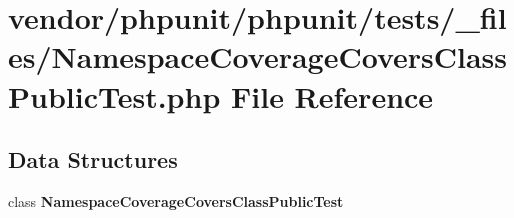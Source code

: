 \section{vendor/phpunit/phpunit/tests/\+\_\+files/\+Namespace\+Coverage\+Covers\+Class\+Public\+Test.php File Reference}
\label{phpunit_2tests_2__files_2_namespace_coverage_covers_class_public_test_8php}
\subsection*{Data Structures}
\begin{DoxyCompactItemize}
\item 
class {\bf Namespace\+Coverage\+Covers\+Class\+Public\+Test}
\end{DoxyCompactItemize}

